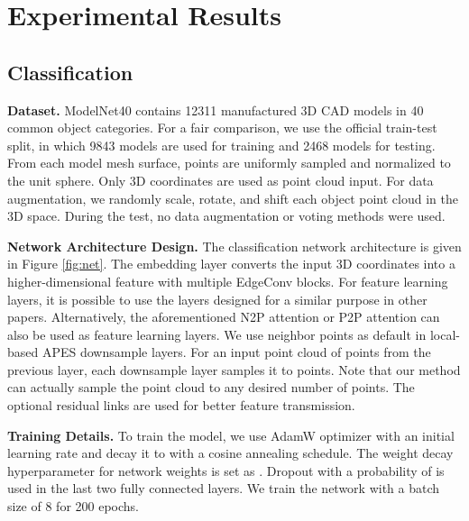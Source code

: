 \documentclass[10pt,twocolumn,letterpaper]{article}
\begin{document}
\section{Experimental Results}
\label{sec:experiments}


\subsection{Classification}
\label{sec:cls}
\textbf{Dataset.}
ModelNet40 \cite{Wu20153DSA} contains 12311 manufactured 3D CAD models in 40 common object categories. For a fair comparison, we use the official train-test split, in which 9843 models are used for training and 2468 models for testing. From each model mesh surface, points are uniformly sampled and normalized to the unit sphere. Only 3D coordinates are used as point cloud input. For data augmentation, we randomly scale, rotate, and shift each object point cloud in the 3D space.
During the test, no data augmentation or voting methods were used.

\textbf{Network Architecture Design.}
The classification network architecture is given in Figure \ref{fig:net}.
The embedding layer converts the input 3D coordinates into a higher-dimensional feature with multiple EdgeConv blocks.
For feature learning layers, it is possible to use the layers designed for a similar purpose in other papers.
Alternatively, the aforementioned N2P attention or P2P attention can also be used as feature learning layers. 
We use  neighbor points as default in local-based APES downsample layers. For an input point cloud of  points from the previous layer, each downsample layer samples it to  points. Note that our method can actually sample the point cloud to any desired number of points. The optional residual links are used for better feature transmission.

\textbf{Training Details.}
To train the model, we use AdamW optimizer with an initial
learning rate  and decay it to  with a cosine annealing schedule. 
The weight decay hyperparameter for network weights is set as . Dropout with a probability of  is used in the last two fully connected layers. 
We train the network with a batch size of 8 for 200 epochs.
\end{document}
